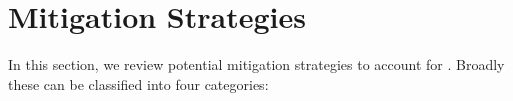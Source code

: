 \section{Mitigation Strategies}
\label{sec:mitigation}
In this section, we review potential mitigation strategies to account for .
Broadly these can be classified into four categories:









